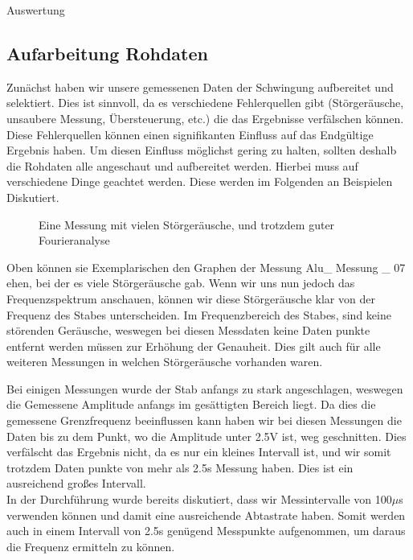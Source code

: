 \documentclass[twoside]{protokoll}
\begin{document}
\begin{aufgabe}{Auswertung}

\subsection{Aufarbeitung Rohdaten}

    
    Zunächst haben wir unsere gemessenen Daten der Schwingung aufbereitet und selektiert.
    Dies ist sinnvoll, da es verschiedene Fehlerquellen gibt (Störgeräusche, unsaubere Messung, Übersteuerung, etc.) die das Ergebnisse verfälschen können.
    Diese Fehlerquellen können einen signifikanten Einfluss auf das Endgültige Ergebnis haben.
    Um diesen Einfluss möglichst gering zu halten, sollten deshalb die Rohdaten alle angeschaut und aufbereitet werden.
    Hierbei muss auf verschiedene Dinge geachtet werden.
    Diese werden im Folgenden an Beispielen Diskutiert. 

\begin{figure}[H]
    \caption{Eine Messung mit vielen Störgeräusche, und trotzdem guter Fourieranalyse}
  \centering
\end{figure}
 
Oben können sie Exemplarischen den Graphen der Messung Alu\_ Messung \_ 07 ehen, bei der es viele Störgeräusche gab.
Wenn wir uns nun jedoch das Frequenzspektrum anschauen, können wir diese Störgeräusche klar von der Frequenz des Stabes unterscheiden.
Im Frequenzbereich des Stabes, sind keine störenden Geräusche, weswegen bei diesen Messdaten keine Daten punkte entfernt werden müssen zur Erhöhung der Genauheit.
Dies gilt auch für alle weiteren Messungen in welchen Störgeräusche vorhanden waren. 

Bei einigen Messungen wurde der Stab anfangs zu stark angeschlagen, weswegen die Gemessene Amplitude anfangs im gesättigten Bereich liegt.
Da dies die gemessene Grenzfrequenz beeinflussen kann  haben wir bei diesen Messungen die Daten bis zu dem Punkt, wo die Amplitude unter 2.5V ist, weg geschnitten.
Dies verfälscht das Ergebnis nicht, da es nur ein kleines Intervall ist, und wir somit trotzdem Daten punkte von mehr als 2.5s Messung haben.
Dies ist ein ausreichend großes Intervall.\\
In der Durchführung wurde bereits diskutiert, dass wir Messintervalle von 100$\mu$s verwenden können und damit eine ausreichende Abtastrate haben.
Somit werden auch in einem Intervall von 2.5s  genügend Messpunkte aufgenommen, um daraus die Frequenz ermitteln zu können.


\end{aufgabe}
\end{document}
